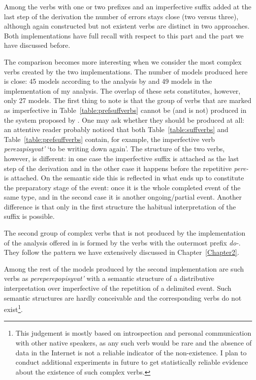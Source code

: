 Among the verbs with one or two prefixes and an imperfective suffix added at the last step of the derivation the number of errors stays close (two versus three), although again constructed but not existent verbs are distinct in two approaches. Both implementations have full recall with respect to this part and the part we have discussed before.

The comparison becomes more interesting when  we consider the most complex verbs created by the two implementations. The number of models produced here is close: 45 models according to the analysis by \citet{Tatevosov:09} and 49 models in the implementation of my analysis. The overlap of these sets constitutes, however, only 27 models. The first thing to note is that the group of verbs that are marked as imperfective in Table~\ref{table:prefsuffverbs} cannot be (and is not) produced in the system proposed by \citet{Tatevosov:09}. One may ask whether they should be produced at all: an attentive reader probably noticed that both Table~\ref{table:suffverbs} and Table~\ref{table:prefsuffverbs} contain, for example, the imperfective verb \textit{perezapisyvat'} `to be writing down again'. The structure of the two verbs, however, is different: in one case the imperfective suffix is attached as the last step of the derivation and in the other case it happens before the repetitive \textit{pere-} is attached. On the semantic side this is reflected in what ends up to constitute the preparatory stage of the event: once it is the whole completed event of the same type, and in the second case it is another ongoing/partial event. Another difference is that only in the first structure the habitual interpretation of the suffix is possible. 

The second group of complex verbs that is not produced by the implementation of the analysis offered in \citealt{Tatevosov:09} is formed by the verbs with the outermost prefix \textit{do-}. They follow the pattern we have extensively discussed in Chapter~\ref{Chapter2}.

Among the rest of the models produced by the second implementation are such verbs as \textit{pereperepopisyvat'} with a semantic structure of a distributive interpretation over imperfective of the repetition of a delimited event. Such semantic structures are hardly conceivable and the corresponding verbs do not exist\footnote{This judgement is mostly based on introspection and personal communication with other native speakers, as any such verb would be rare and the absence of data in the Internet is not a reliable indicator of the non-existence. I plan to conduct additional experiments in future to get statistically reliable evidence about the existence of such complex verbs.}.


